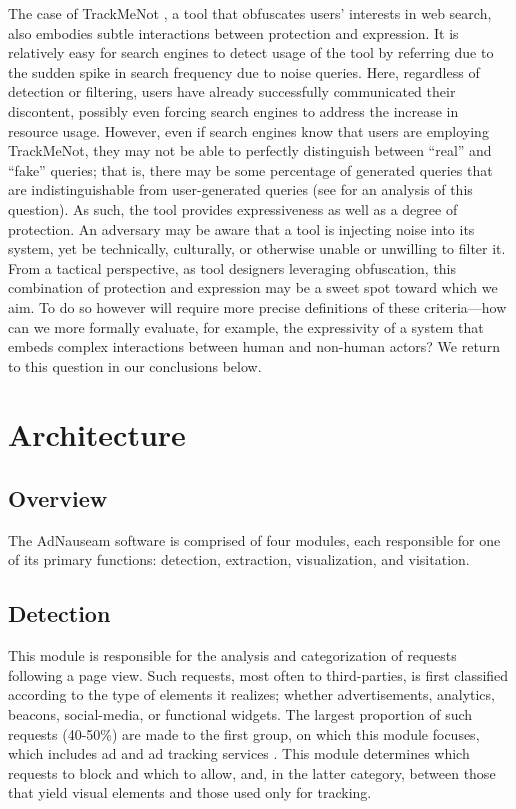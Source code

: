 \documentclass[conference]{IEEEtran}
\begin{document}
The case of TrackMeNot \cite{Howe-2}, a tool that obfuscates users' interests in web search, also embodies subtle interactions between protection and expression. It is relatively easy for search engines to detect usage of the tool by referring due to the sudden spike in search frequency due to noise queries. Here, regardless of detection or filtering, users have already successfully communicated their discontent, possibly even forcing search engines to address the increase in resource usage. However, even if search engines know that users are employing TrackMeNot, they may not be able to perfectly distinguish between “real” and “fake” queries; that is, there may be some percentage of generated queries that are indistinguishable from user-generated queries (see \cite{Gervais} for an analysis of this question). As such, the tool provides expressiveness as well as a degree of protection. An adversary may be aware that a tool is injecting noise into its system, yet be technically, culturally, or otherwise unable or unwilling to filter it. From a tactical perspective, as tool designers leveraging obfuscation, this combination of protection and expression may be a sweet spot toward which we aim. To do so however will require more precise definitions of these criteria---how can we more formally evaluate, for example, the expressivity of a system that embeds complex interactions between human and non-human actors? We return to this question in our conclusions below.


\section{Architecture}

\subsection{Overview}

The AdNauseam software is comprised of four modules, each responsible for one of its primary functions: detection, extraction, visualization, and visitation.

\subsection{Detection}

This module is responsible for the analysis and categorization of requests following a page view. Such requests, most often to third-parties, is first classified according to the type of elements it realizes; whether advertisements, analytics, beacons, social-media, or functional widgets. The largest proportion of such requests (40-50\%) are made to the first group, on which this module focuses, which includes ad and ad tracking services \cite{Wills}. This module determines which requests to block and which to allow, and, in the latter category, between those that yield visual elements and those used only for tracking.
\end{document}
